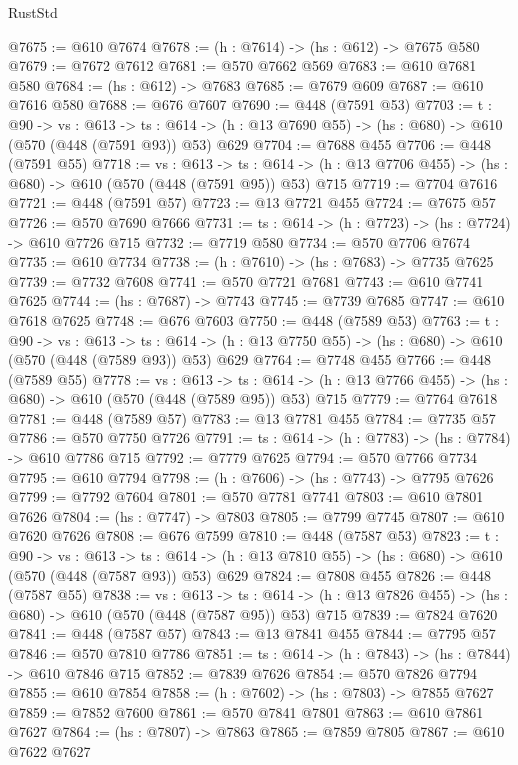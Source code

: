 \begin{lexlean}{RustStd}
\begin{coremodule}
@7675 := @610 @7674
@7678 := (h : @7614) -> (hs : @612) -> @7675 @580
@7679 := @7672 @7612
@7681 := @570 @7662 @569
@7683 := @610 @7681 @580
@7684 := (hs : @612) -> @7683
@7685 := @7679 @609
@7687 := @610 @7616 @580
@7688 := @676 @7607
@7690 := @448 (@7591 @53)
@7703 := {t : @90} ->
  {vs : @613} ->
  {ts : @614} -> (h : @13 @7690 @55) -> (hs : @680) -> @610 (@570 (@448 (@7591 @93)) @53) @629
@7704 := @7688 @455
@7706 := @448 (@7591 @55)
@7718 := {vs : @613} ->
  {ts : @614} -> (h : @13 @7706 @455) -> (hs : @680) -> @610 (@570 (@448 (@7591 @95)) @53) @715
@7719 := @7704 @7616
@7721 := @448 (@7591 @57)
@7723 := @13 @7721 @455
@7724 := @7675 @57
@7726 := @570 @7690 @7666
@7731 := {ts : @614} -> (h : @7723) -> (hs : @7724) -> @610 @7726 @715
@7732 := @7719 @580
@7734 := @570 @7706 @7674
@7735 := @610 @7734
@7738 := (h : @7610) -> (hs : @7683) -> @7735 @7625
@7739 := @7732 @7608
@7741 := @570 @7721 @7681
@7743 := @610 @7741 @7625
@7744 := (hs : @7687) -> @7743
@7745 := @7739 @7685
@7747 := @610 @7618 @7625
@7748 := @676 @7603
@7750 := @448 (@7589 @53)
@7763 := {t : @90} ->
  {vs : @613} ->
  {ts : @614} -> (h : @13 @7750 @55) -> (hs : @680) -> @610 (@570 (@448 (@7589 @93)) @53) @629
@7764 := @7748 @455
@7766 := @448 (@7589 @55)
@7778 := {vs : @613} ->
  {ts : @614} -> (h : @13 @7766 @455) -> (hs : @680) -> @610 (@570 (@448 (@7589 @95)) @53) @715
@7779 := @7764 @7618
@7781 := @448 (@7589 @57)
@7783 := @13 @7781 @455
@7784 := @7735 @57
@7786 := @570 @7750 @7726
@7791 := {ts : @614} -> (h : @7783) -> (hs : @7784) -> @610 @7786 @715
@7792 := @7779 @7625
@7794 := @570 @7766 @7734
@7795 := @610 @7794
@7798 := (h : @7606) -> (hs : @7743) -> @7795 @7626
@7799 := @7792 @7604
@7801 := @570 @7781 @7741
@7803 := @610 @7801 @7626
@7804 := (hs : @7747) -> @7803
@7805 := @7799 @7745
@7807 := @610 @7620 @7626
@7808 := @676 @7599
@7810 := @448 (@7587 @53)
@7823 := {t : @90} ->
  {vs : @613} ->
  {ts : @614} -> (h : @13 @7810 @55) -> (hs : @680) -> @610 (@570 (@448 (@7587 @93)) @53) @629
@7824 := @7808 @455
@7826 := @448 (@7587 @55)
@7838 := {vs : @613} ->
  {ts : @614} -> (h : @13 @7826 @455) -> (hs : @680) -> @610 (@570 (@448 (@7587 @95)) @53) @715
@7839 := @7824 @7620
@7841 := @448 (@7587 @57)
@7843 := @13 @7841 @455
@7844 := @7795 @57
@7846 := @570 @7810 @7786
@7851 := {ts : @614} -> (h : @7843) -> (hs : @7844) -> @610 @7846 @715
@7852 := @7839 @7626
@7854 := @570 @7826 @7794
@7855 := @610 @7854
@7858 := (h : @7602) -> (hs : @7803) -> @7855 @7627
@7859 := @7852 @7600
@7861 := @570 @7841 @7801
@7863 := @610 @7861 @7627
@7864 := (hs : @7807) -> @7863
@7865 := @7859 @7805
@7867 := @610 @7622 @7627

\end{coremodule}
\end{lexlean}
